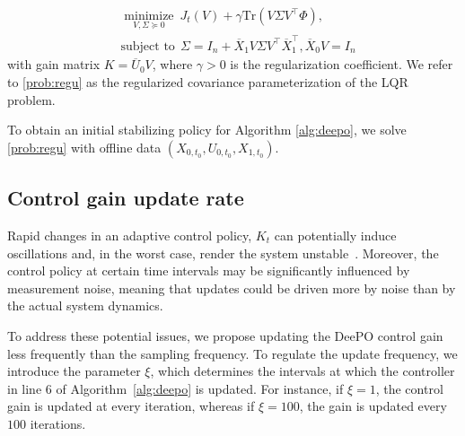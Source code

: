 	\begin{equation}\label{prob:regu}
	\begin{aligned}
	&\mathop{\text {minimize}}\limits_{V, \Sigma\succeq 0}~ J_t(V) + \gamma\text{Tr}(V\Sigma V^{\top}\Phi),\\
	&\text{subject to}~ ~\Sigma = I_n + \overline{X}_1V\Sigma V^{\top}\overline{X}_1^{\top},\overline{X}_0V= I_n
	\end{aligned}
	\end{equation}
	with gain matrix $K = \overline{U}_0V$, where $\gamma>0$ is the regularization coefficient. We refer to \eqref{prob:regu} as the regularized covariance parameterization of the LQR problem.

    To obtain an initial stabilizing policy for Algorithm \ref{alg:deepo}, we solve \eqref{prob:regu} with offline data $(X_{0,t_0}, U_{0,t_0}, X_{1,t_0})$.

\subsection{Control gain update rate}
Rapid changes in an adaptive control policy, $K_t$ can potentially induce oscillations and, in the worst case, render the system unstable~\cite{landau2011adaptive}. Moreover, the control policy at certain time intervals may be significantly influenced by measurement noise, meaning that updates could be driven more by noise than by the actual system dynamics. 

To address these potential issues, we propose updating the DeePO control gain less frequently than the sampling frequency. To regulate the update frequency, we introduce the parameter $\xi$, which determines the intervals at which the controller in line 6 of Algorithm~\ref{alg:deepo} is updated. For instance, if $\xi = 1$, the control gain is updated at every iteration, whereas if $\xi = 100$, the gain is updated every $100$ iterations.








